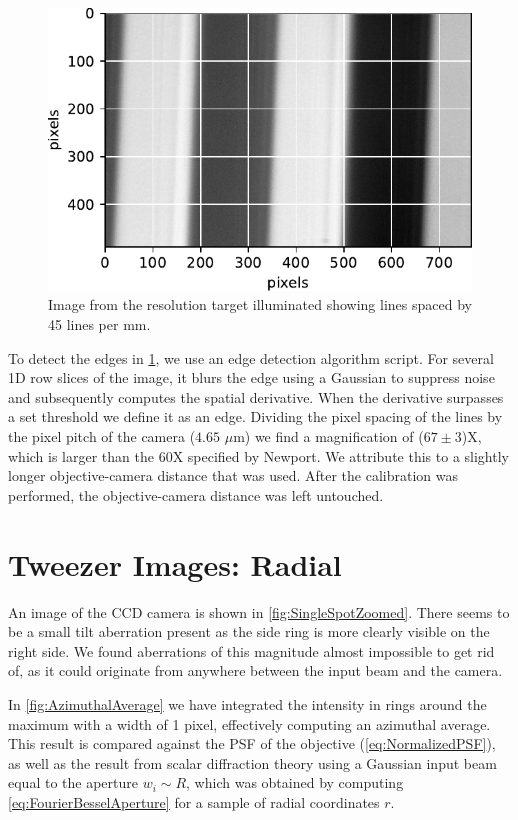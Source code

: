 \begin{figure}
    \centering
    \includegraphics[width = 0.42\linewidth]{figures/LineSpacingCalibration.pdf}
    \caption{Image from the resolution target illuminated showing lines spaced by 45 lines per mm.}
    \label{fig:resolutionTarget}
\end{figure}

To detect the edges in \cref{fig:resolutionTarget}, we use an edge detection algorithm script.
For several 1D row slices of the image, it blurs the edge using a Gaussian to suppress noise and subsequently computes the spatial derivative. 
When the derivative surpasses a set threshold we define it as an edge.
Dividing the pixel spacing of the lines by the pixel pitch of the camera ($4.65$ $\mu$m) we find a magnification of ($67 \pm 3$)X, which is larger than the 60X specified by Newport. 
We attribute this to a slightly longer objective-camera distance that was used. 
After the calibration was performed, the objective-camera distance was left untouched. 

\section{Tweezer Images: Radial}

An image of the CCD camera is shown in \cref{fig:SingleSpotZoomed}. 
There seems to be a small tilt aberration present as the side ring is more clearly visible on the right side. 
We found aberrations of this magnitude almost impossible to get rid of, as it could originate from anywhere between the input beam and the camera.

In \cref{fig:AzimuthalAverage} we have integrated the intensity in rings around the maximum with a width of 1 pixel, effectively computing an azimuthal average. 
This result is compared against the \ac{PSF} of the objective (\cref{eq:NormalizedPSF}), as well as the result from scalar diffraction theory using a Gaussian input beam equal to the aperture $w_i \sim R$, which was obtained by computing \cref{eq:FourierBesselAperture} for a sample of radial coordinates $r$. 

